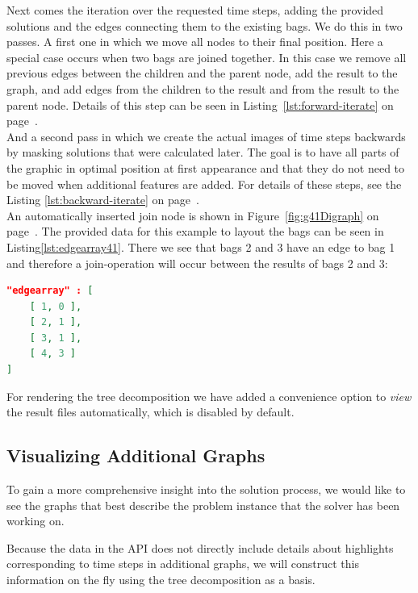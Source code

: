 \documentclass[a4paper, 12pt, bibliography=totoc]{scrartcl}
\begin{document}
Next comes the iteration over the requested time steps, adding the provided solutions and the edges connecting them to the existing bags. We do this in two passes.  A first one in which we move all nodes to their final position. Here a special case occurs when two bags are joined together.
In this case we remove all previous edges between the children and the parent node, add the result to the graph, and add edges from the children to the result and from the result to the parent node. Details of this step can be seen in Listing~\ref{lst:forward-iterate} on page~\pageref{lst:forward-iterate}. \\
And a second pass in which we create the actual images of time steps backwards by masking solutions that were calculated later. The goal is to have all parts of the graphic in optimal position at first appearance and that they do not need to be moved when additional features are added. For details of these steps, see the Listing \ref{lst:backward-iterate} on page~\pageref{lst:backward-iterate}.\\

An automatically inserted join node is shown in Figure~\ref{fig:g41Digraph} on page~\pageref{fig:g41Digraph}.
The provided data for this example to layout the bags can be seen in Listing\ref{lst:edgearray41}. There we see that bags 2 and 3 have an edge to bag 1 and therefore a join-operation will occur between the results of bags 2 and 3:

\begin{lstlisting}[language=json,caption={Structure provided for bags of example \ref{fig:g41Digraph} },xleftmargin=5.5cm,xrightmargin=5.8cm,label={lst:edgearray41}]
"edgearray" : [
	[ 1, 0 ],
	[ 2, 1 ],
	[ 3, 1 ],
	[ 4, 3 ]
]
\end{lstlisting}
\noindent
For rendering the tree decomposition we have added a convenience option to \textit{view} the result files automatically, which is disabled by default.

\subsection{Visualizing Additional Graphs}
To gain a more comprehensive insight into the solution process, we would like to see the graphs that best describe the problem instance that the solver has been working on.

Because the data in the API does not directly include details about highlights corresponding to time steps in additional graphs, we will construct this information on the fly using the tree decomposition as a basis.
\end{document}
